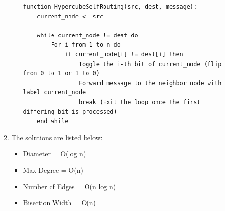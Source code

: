 \documentclass{article}
\begin{document}
\begin{enumerate}
\begin{enumerate}
\begin{enumerate}
\begin{verbatim}
function HypercubeSelfRouting(src, dest, message):
    current_node <- src

    while current_node != dest do
        For i from 1 to n do
            if current_node[i] != dest[i] then
                Toggle the i-th bit of current_node (flip from 0 to 1 or 1 to 0)
                Forward message to the neighbor node with label current_node
                break (Exit the loop once the first differing bit is processed)
    end while
                        \end{verbatim}

                \end{enumerate}
            \item The solutions are listed below:
                \begin{itemize}
                    \item Diameter = O(log n)
                    \item Max Degree = O(n)
                    \item Number of Edges = O(n log n)
                    \item Bisection Width = O(n)
                \end{itemize}
        \end{enumerate}


\end{enumerate}
\end{document}

